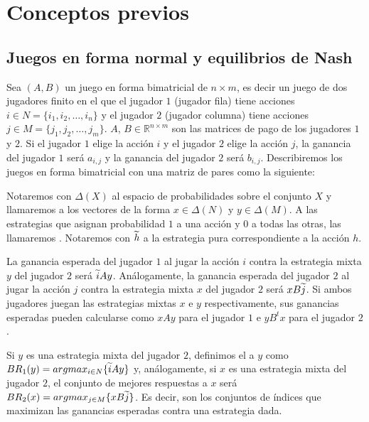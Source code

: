 \chapter{Conceptos previos}  \label{cap:previos}


\section{Juegos en forma normal y equilibrios de Nash}

Sea $(A, B)$ un juego en forma bimatricial de $n \times m$, es decir un juego de dos jugadores finito en el que el jugador $1$ (jugador fila) tiene acciones $i \in N = \{i_1, i_2, \dots, i_n\}$ y el jugador $2$ (jugador columna) tiene acciones $j \in M = \{j_1, j_2, \dots, j_m\}$. $A$, $B \in \mathbb{R}^{n \times m}$ son las matrices de pago de los jugadores $1$ y $2$. Si el jugador $1$ elige la acción $i$ y el jugador $2$ elige la acción $j$, la ganancia del jugador $1$ será $a_{i,j}$ y la ganancia del jugador $2$ será $b_{i,j}$. Describiremos los juegos en forma bimatricial con una matriz de pares como la siguiente:



Notaremos con $\Delta(X)$ al espacio de probabilidades sobre el conjunto $X$ y llamaremos  a los vectores de la forma $x \in \Delta(N)$ y $y \in \Delta(M)$. A las estrategias que asignan probabilidad $1$ a una acción y $0$ a todas las otras, las llamaremos . Notaremos con $\widetilde{h}$ a la estrategia pura correspondiente a la acción $h$.

La ganancia esperada del jugador $1$ al jugar la acción $i$ contra la estrategia mixta $y$ del jugador $2$ será $\widetilde{i}Ay$. Análogamente, la ganancia esperada del jugador $2$ al jugar la acción $j$ contra la estrategia mixta $x$ del jugador $2$ será $xB\widetilde{j}$. Si ambos jugadores juegan las estrategias mixtas $x$ e $y$ respectivamente, sus ganancias esperadas pueden calcularse como $xAy$ para el jugador $1$ e $yB^tx$ para el jugador $2$.

Si $y$ es una estrategia mixta del jugador $2$, definimos el  a $y$ como $BR_1(y) = argmax_{i \in N}\{\widetilde{i}Ay\}$ y, análogamente, si $x$ es una estrategia mixta del jugador $2$, el conjunto de mejores respuestas a $x$ será $BR_2(x) = argmax_{j \in M}\{xB\widetilde{j}\}$. Es decir, son los conjuntos de índices que maximizan las ganancias esperadas contra una estrategia dada.

